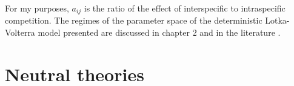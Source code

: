 For my purposes, $a_{ij}$ is the ratio of the effect of interspecific to intraspecific competition. 
%
The regimes of the parameter space of the deterministic Lotka-Volterra model presented are discussed in chapter 2 and in the literature \cite{Neuhauser1999,Cox2010,Chotibut2015}. 


\section{Neutral theories}

